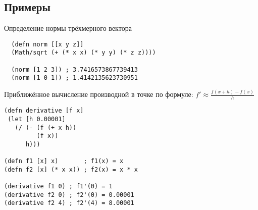 \subsection{Примеры}

Определение нормы трёхмерного вектора

\begin{verbatim}
  (defn norm [[x y z]]
  (Math/sqrt (+ (* x x) (* y y) (* z z))))

  (norm [1 2 3]) ; 3.7416573867739413
  (norm [1 0 1]) ; 1.4142135623730951
\end{verbatim}

Приближённое вычисление производной в точке по формуле: \( f' \approx \frac{f(x+h) - f(x)}{h}\)

\begin{verbatim}
(defn derivative [f x]
 (let [h 0.00001]
   (/ (- (f (+ x h))
         (f x))
      h)))

(defn f1 [x] x)       ; f1(x) = x
(defn f2 [x] (* x x)) ; f2(x) = x * x

(derivative f1 0) ; f1'(0) = 1
(derivative f2 0) ; f2'(0) = 0.00001
(derivative f2 4) ; f2'(4) = 8.00001
\end{verbatim}

